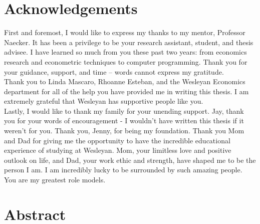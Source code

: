 \documentclass[12pt]{article}
\begin{document}


\newpage
\onehalfspacing
\tableofcontents
\thispagestyle{empty}


\newpage

\clearpage
{} 
\doublespacing
\section*{Acknowledgements}
First and foremost, I would like to express my thanks to my mentor, Professor Naecker. It has been a privilege to be your research assistant, student, and thesis advisee. I have learned so much from you these past two years: from economics research and econometric techniques to computer programming. Thank you for your guidance, support, and time -- words cannot express my gratitude.\\

Thank you to Linda Mascaro, Rhoanne Esteban, and the Wesleyan Economics department for all of the help you have provided me in writing this thesis. I am extremely grateful that Wesleyan has supportive people like you. \\

Lastly, I would like to thank my family for your unending support. Jay, thank you for your words of encouragement - I wouldn\rq t have written this thesis if it weren\rq t for you. Thank you, Jenny, for being my foundation. Thank you Mom and Dad for giving me the opportunity to have the incredible educational experience of studying at Wesleyan. Mom, your limitless love and positive outlook on life, and Dad, your work ethic and strength, have shaped me to be the person I am. I am incredibly lucky to be surrounded by such amazing people. You are my greatest role models.


\newpage

\section*{Abstract}
\end{document}
